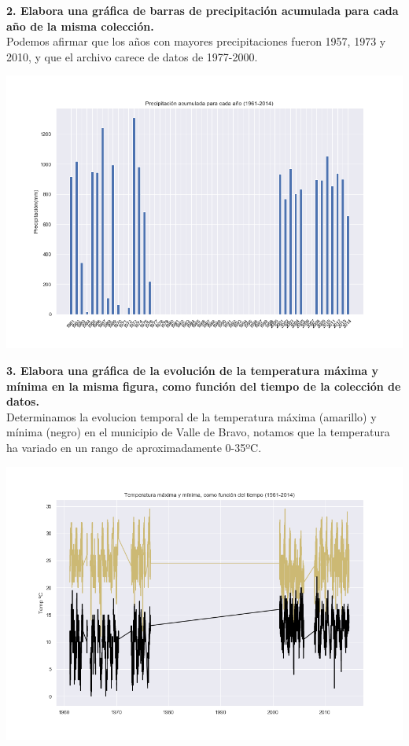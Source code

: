 \documentclass[12pt]{article}
\begin{document}
\noindent\textbf {2. Elabora una gráfica de barras de precipitación acumulada para cada año de la misma colección.} \\
Podemos afirmar que los años con mayores precipitaciones fueron 1957, 1973 y 2010, y que el archivo carece de datos de 1977-2000.
\begin{center}
\includegraphics[scale=0.4]{Precip_anu.png}
\end{center} 

\noindent\textbf {3. Elabora una gráfica de la evolución de la temperatura máxima y mínima en la misma figura, como función del tiempo de la colección de datos.} \\
Determinamos la evolucion temporal de la temperatura máxima (amarillo) y mínima (negro) en el municipio de Valle de Bravo, notamos que la temperatura ha variado en un rango de aproximadamente 0-35ºC.
\begin{center}
\includegraphics[scale=0.5]{Temp_maxymin.png}
\end{center} 
\end{document}

